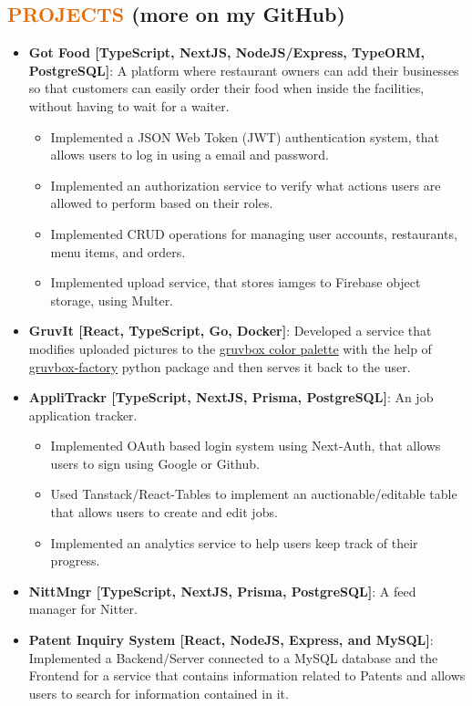 \documentclass[a4paper, 20pt]{article}
\newcommand{\resumeItem}[2]{
  \item\small{
    \textbf{#1}{: #2 \vspace{-2pt}}
  }
}
\newcommand{\resumeSubItem}[2]{\resumeItem{#1}{#2}\vspace{-3pt}}
\newcommand{\resumeSubHeadingListStart}{\begin{itemize}[leftmargin=*]}
\newcommand{\resumeSubHeadingListEnd}{\end{itemize}}
\begin{document}
\begin{CJK*}{UTF8}{gbsn}
\section{\textcolor[HTML]{E36C09}{\textbf{PROJECTS}} \tiny{(more on my GitHub)}}
\resumeSubHeadingListStart{}
      \resumeSubItem{Got Food [TypeScript, NextJS, NodeJS/Express, TypeORM, PostgreSQL]}
      {A platform where restaurant owners can add their businesses so that customers can easily order their food when inside the facilities, without having to wait for a waiter.}
      \begin{itemize}
        \item{Implemented a JSON Web Token (JWT) authentication system, that allows users to log in using a email and password.}
        \item{Implemented an authorization service to verify what actions users are allowed to perform based on their roles.}
        \item{Implemented CRUD operations for managing user accounts, restaurants, menu items, and orders.}
        \item{Implemented upload service, that stores iamges to Firebase object storage, using Multer.}
      \end{itemize}
      \vspace{2pt}
      \resumeSubItem{GruvIt [React, TypeScript, Go, Docker]}
      {Developed a service that modifies uploaded pictures to the \href{https://github.com/morhetz/gruvbox}{gruvbox color palette} with the help of \href{https://github.com/paulopacitti/gruvbox-factory}{gruvbox-factory} python package and then serves it back to the user.}
      \vspace{2pt}
      \resumeSubItem{AppliTrackr [TypeScript, NextJS, Prisma, PostgreSQL]}
      {An job application tracker.}
      \begin{itemize}
        \item{Implemented OAuth based login system using Next-Auth, that allows users to sign using Google or Github.}
        \item{Used Tanstack/React-Tables to implement an auctionable/editable table that allows users to create and edit jobs.}
        \item{Implemented an analytics service to help users keep track of their progress.}
      \end{itemize}
      \vspace{2pt}
      \resumeSubItem{NittMngr [TypeScript, NextJS, Prisma, PostgreSQL]}
      {A feed manager for Nitter.}
      \vspace{2pt}
      \resumeSubItem{Patent Inquiry System [React, NodeJS, Express, and MySQL]}
      {Implemented a Backend/Server connected to a MySQL database and the Frontend for a service that contains information related to Patents and allows users to search for information contained in it.}
      \vspace{2pt}
\resumeSubHeadingListEnd{}


\end{CJK*}
\end{document}
